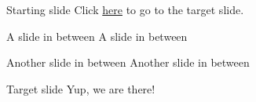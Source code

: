 \documentclass[pdf,umbc4,slideColor,colorBG]{prosper}
\begin{document}
\begin{slide}{Starting slide}
Click \hyperlink{mytarget}{here} to go to the target slide.
\end{slide}

\begin{slide}{A slide in between}
A slide in between
\end{slide}

\begin{slide}{Another slide in between}
Another slide in between
\end{slide}

\begin{slide}{Target slide}
\hypertarget{mytarget}{}
Yup, we are there!
\end{slide}
\end{document}
